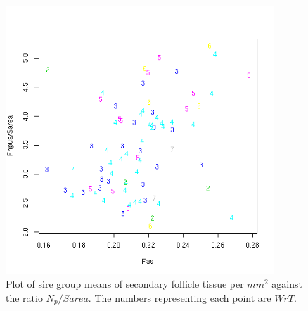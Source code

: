 %

\begin{figure}[!h]
  \centering
   \includegraphics[width=0.9\textwidth]{fasfnpuaovsa.png}
  \caption{Plot of sire group means  of secondary follicle tissue per $mm^{2}$ against the ratio $N_{p}/Sarea$. The numbers representing each point are $WrT$.}
  \label{fig:fasfnpuaovsa}
\end{figure}

%

